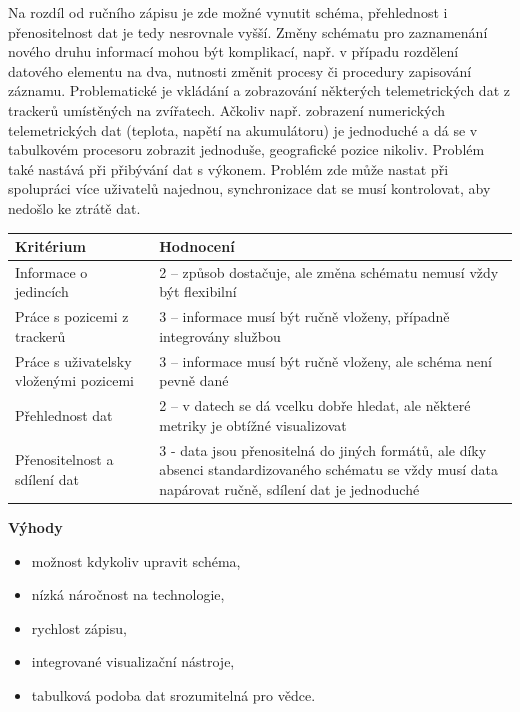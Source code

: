 Na rozdíl od ručního zápisu je zde možné vynutit schéma, přehlednost i přenositelnost dat je tedy nesrovnale vyšší. Změny schématu pro zaznamenání nového druhu informací mohou být komplikací, např. v případu rozdělení datového elementu na dva, nutnosti změnit procesy či procedury zapisování záznamu. Problematické je vkládání a zobrazování některých telemetrických dat z trackerů umístěných na zvířatech. Ačkoliv např. zobrazení numerických telemetrických dat (teplota, napětí na akumulátoru) je jednoduché a dá se v tabulkovém procesoru zobrazit jednoduše, geografické pozice nikoliv. Problém také nastává při přibývání dat s výkonem. Problém zde může nastat při spolupráci více uživatelů najednou, synchronizace dat se musí kontrolovat, aby nedošlo ke ztrátě dat.

\begin{table}[h]
	\begin{tabular}{ l | l }
		Kritérium                              & Hodnocení \\
		\hline			
		Informace o jedincích                  & 2 -- způsob dostačuje, ale změna schématu nemusí vždy být flexibilní          \\
		Práce s pozicemi z trackerů            & 3 -- informace musí být ručně vloženy, případně integrovány službou          \\
		Práce s uživatelsky vloženými pozicemi & 3 -- informace musí být ručně vloženy, ale schéma není pevně dané          \\
		Přehlednost dat                        & 2 -- v datech se dá vcelku dobře hledat, ale některé metriky je obtížné visualizovat          \\
		Přenositelnost a sdílení dat           & 3 - data jsou přenositelná do jiných formátů, ale díky absenci standardizovaného schématu se vždy musí data napárovat ručně, sdílení dat je jednoduché          \\
		\hline	
	\end{tabular}
\end{table}

\textbf{Výhody}

\begin{itemize}
	\item možnost kdykoliv upravit schéma,
	\item nízká náročnost na technologie,
	\item rychlost zápisu,
	\item integrované visualizační nástroje,
	\item tabulková podoba dat srozumitelná pro vědce.
\end{itemize}

